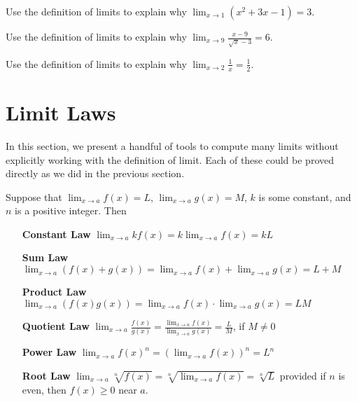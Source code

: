 \begin{exercises}
\begin{exercise} 
Use the definition of limits to explain why $\lim_{x\to 1} (x^2+3x-1) = 3$.
\end{exercise}


\begin{exercise} 
Use the definition of limits to explain why $\lim_{x\to 9}\frac{x-9}{\sqrt{x}-3}
= 6$.
\end{exercise}


\begin{exercise} 
Use the definition of limits to explain why $\lim_{x\to 2}\frac{1}{x}
= \frac{1}{2}$.
\end{exercise}






\end{exercises}


\section{Limit Laws}

In this section, we present a handful of tools to compute many limits
without explicitly working with the definition of limit. Each of these
could be proved directly as we did in the previous section.

\begin{mainTheorem}\label{theorem:limit-laws}
Suppose that $\lim_{x\to a}f(x)=L$, $\lim_{x\to a}g(x)=M$, $k$
is some constant, and $n$ is a positive integer. Then
\begin{itemize}
\item[\textbf{Constant Law}] $\lim_{x\to a} kf(x) = k\lim_{x\to a}f(x)=kL$ 
\item[\textbf{Sum Law}] $\lim_{x\to a} (f(x)+g(x)) = \lim_{x\to a}f(x)+\lim_{x\to a}g(x)=L+M$  
\item[\textbf{Product Law}] $\lim_{x\to a} (f(x)g(x)) = \lim_{x\to a}f(x)\cdot\lim_{x\to a}g(x)=LM$ 
\item[\textbf{Quotient Law}] $\lim_{x\to a} \frac{f(x)}{g(x)} =
  \frac{\lim_{x\to a}f(x)}{\lim_{x\to a}g(x)}=\frac{L}{M}$, if $M\ne0$
\item[\textbf{Power Law}] $\lim_{x\to a} f(x)^n = \left(\lim_{x\to a}f(x)\right)^n=L^n$
\item[\textbf{Root Law}] $\lim_{x\to a} \sqrt[n]{f(x)} = \sqrt[n]{\lim_{x\to
    a}f(x)}=\sqrt[n]{L}$ provided if $n$ is even, then $f(x)\ge 0$
  near $a$.
\end{itemize}
\label{thm:limit laws}
\end{mainTheorem}

